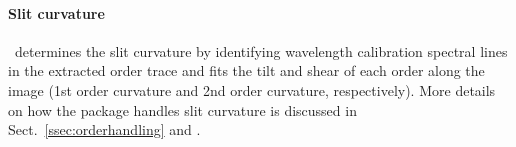 \paragraph{Slit curvature}\label{sec:critalg_orderrect}


\pyred~determines the slit curvature by identifying wavelength calibration spectral lines in the extracted order trace and fits the tilt and shear of each order along the image (1st order curvature and 2nd order curvature, respectively). More details on how the package handles slit curvature is discussed in Sect.~\ref{ssec:orderhandling} and \cite{pis21}. 

